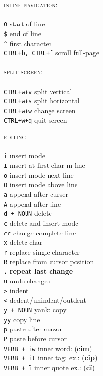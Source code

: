 \documentclass[a4paper,10pt]{scrartcl}
\begin{document}
\begin{multicols}{2}
\begin{tabbing}
\large{\textsc{inline navigation:}}\\\\
\texttt{0}					\> start of line\\
\texttt{\$}					\> end of line \\
\texttt{\^}					\> first character\\
\texttt{CTRL+b, CTRL+f}		\> scroll full-page\\\\

\large{\textsc{split screen:}}\\\\
\texttt{CTRL+w+v}	\> split vertical\\
\texttt{CTRL+w+s}	\> split horizontal\\
\texttt{CTRL+w+w}	\> change screen\\
\texttt{CTRL+w+q}	\> quit screen\\
\end{tabbing}

\begin{tabbing}
\large{\textsc{editing}}\\\\
\texttt{i}				\hspace{2cm}\= insert mode\\
\texttt{I}				\> insert at first char in line\\
\texttt{o}				\> insert mode next line\\
\texttt{O}				\> insert mode above line\\
\texttt{a}				\> append after curser\\
\texttt{A}				\> append after line\\
\texttt{d + NOUN}		\> delete\\
\texttt{c}				\> delete and insert mode \\
\texttt{cc}				\> change complete line \\
\texttt{x}				\> delete char\\
\texttt{r}				\> replace single character\\
\texttt{R}				\> replace from cursor position\\
\texttt{\textbf{.}}		\> \textbf{repeat last change}\\
\texttt{u}				\> undo changes\\
\texttt{>}				\> indent\\
\texttt{<}				\> dedent/unindent/outdent\\
\texttt{y + NOUN}		\> yank: copy\\
\texttt{yy}				\> copy line\\
\texttt{p}				\> paste after cursor\\
\texttt{P}				\> paste before cursor\\
\texttt{VERB + iw}		\> inner word: (\textbf{cim})\\
\texttt{VERB + it}		\> inner tag: ex.: (\textbf{cip})\\
\texttt{VERB + i\"}		\> inner quote ex.: (\textbf{ci\"})\\




\end{tabbing}
\end{multicols}
\end{document}
